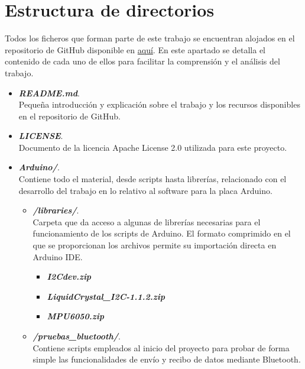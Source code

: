 
\section{Estructura de directorios}

Todos los ficheros que forman parte de este trabajo se encuentran alojados en el repositorio de GitHub disponible en \href{https://github.com/imb1006/Web_Seguimiento_Parkinson}{aquí}. En este apartado se detalla el contenido de cada uno de ellos para facilitar la comprensión y el análisis del trabajo.

\begin{itemize}
    \item \textbf{\textit{README.md}}.\\
    Pequeña introducción y explicación sobre el trabajo y los recursos disponibles en el repositorio de GitHub.
    \item \textbf{\textit{LICENSE}}.\\
    Documento de la licencia Apache License 2.0 utilizada para este proyecto.
    \item \textbf{\textit{Arduino/}}.\\
    Contiene todo el material, desde scripts hasta librerías, relacionado con el desarrollo del trabajo en lo relativo al software para la placa Arduino.
    \begin{itemize}
        \item \textbf{\textit{/libraries/}}.\\
        Carpeta que da acceso a algunas de librerías necesarias para el funcionamiento de los scripts de Arduino. El formato comprimido en el que se proporcionan los archivos permite su importación directa en Arduino IDE.
        \begin{itemize}
            \item \textbf{\textit{I2Cdev.zip}}
            \item \textbf{\textit{LiquidCrystal\_I2C-1.1.2.zip}}
            \item \textbf{\textit{MPU6050.zip}}
        \end{itemize}
        \item \textbf{\textit{/pruebas\_bluetooth/}}.\\
        Contiene scripts empleados al inicio del proyecto para probar de forma simple las funcionalidades de envío y recibo de datos mediante Bluetooth.
        \begin{itemize}

\end{itemize}
\end{itemize}
\end{itemize}

